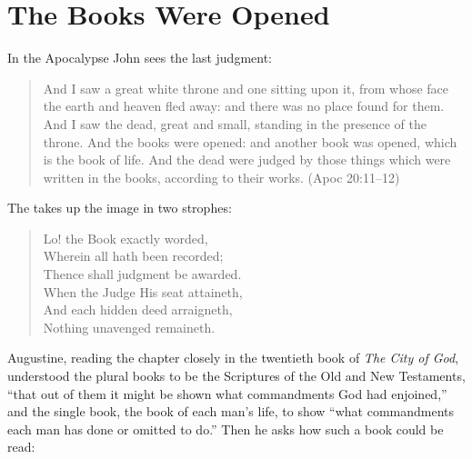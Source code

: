 \section{The Books Were Opened}\label{sec:books}

In the Apocalypse John sees the last judgment:

\begin{quote}
And I saw a great white throne and one sitting upon it, from whose face the earth and heaven fled away: and there was no place found for them. And I saw the dead, great and small, standing in the presence of the throne. And the books were opened: and another book was opened, which is the book of life. And the dead were judged by those things which were written in the books, according to their works. (Apoc 20:11--12)
\end{quote}

The  takes up the image in two strophes:

\begin{quote}

\medskip
Lo! the Book exactly worded,\\
Wherein all hath been recorded;\\
Thence shall judgment be awarded.\\
When the Judge His seat attaineth,\\
And each hidden deed arraigneth,\\
Nothing unavenged remaineth.
\end{quote}

Augustine, reading the chapter closely in the twentieth book of \emph{The City of God}, understood the plural books to be the Scriptures of the Old and New Testaments, ``that out of them it might be shown what commandments God had enjoined,'' and the single book, the book of each man's life, to show ``what commandments each man has done or omitted to do.'' Then he asks how such a book could be read:

